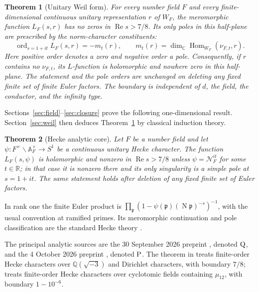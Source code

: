 \documentclass[11pt,a4paper]{article}
\numberwithin{equation}{section}
\newtheorem{theorem}{Theorem}[section]
\theoremstyle{definition}
\theoremstyle{remark}
\newcommand{\RR}{\mathbb R}
\newcommand{\CC}{\mathbb C}
\newcommand{\Rea}{\operatorname{Re}}
\newcommand{\Norm}{\operatorname{N}}
\newcommand{\Qsrc}{\textup{Q}}
\newcommand{\Psrc}{\textup{P}}
\begin{document}
\begin{theorem}[Unitary Weil form]\label{thm:weil-main}
For every number field $F$ and every finite-dimensional continuous
unitary representation $r$ of $W_F$, the meromorphic function
$L_F(s,r)$ has no zeros in $\Rea s>7/8$.  Its only poles in this
half-plane are prescribed by the norm-character constituents:
\begin{equation}\label{eq:weil-main-divisor}
 \operatorname{ord}_{s=1+it}L_F(s,r)
   =-m_t(r),\qquad
 m_t(r)=\dim_{\CC}\operatorname{Hom}_{W_F}(\nu_{F,t},r).
\end{equation}
Here positive order denotes a zero and negative order a pole.
Consequently, if $r$ contains no $\nu_{F,t}$, its $L$-function is
holomorphic and nowhere zero in this half-plane.  The statement and
the pole orders are unchanged on deleting any fixed finite set of
finite Euler factors.  The boundary is independent of $d$, the field,
the conductor, and the infinity type.
\end{theorem}

Sections~\ref{sec:field}--\ref{sec:closure} prove the following
one-dimensional result. Section~\ref{sec:weil} then deduces
Theorem~\ref{thm:weil-main} by classical induction theory.

\begin{theorem}[Hecke analytic core]\label{thm:main}
Let $F$ be a number field and let
$\psi:F^\times\backslash\mathbb A_F^\times\longrightarrow S^1$
be a continuous unitary Hecke character. The function $L_F(s,\psi)$
is holomorphic and nonzero in $\Rea s>7/8$ unless
$\psi=\mathcal N_F^{it}$ for some $t\in\RR$; in that case it is
nonzero there and its only singularity is a simple pole at $s=1+it$.
The same statement holds after deletion of any fixed finite set of
Euler factors.
\end{theorem}

In rank one the finite Euler product is
$\prod_{\mathfrak p}(1-\psi(\mathfrak p)(\Norm\mathfrak p)^{-s})^{-1}$,
with the usual convention at ramified primes.  Its meromorphic
continuation and pole classification are the standard Hecke theory
\cite{Tate}.

The principal analytic sources are the 30 September 2026 preprint
\cite{Q}, denoted $\Qsrc$, and the 4 October 2026 preprint
\cite{P}, denoted $\Psrc$. The theorem in \cite[Theorem~1.1]{Q} treats finite-order Hecke
characters over $\mathbb Q(\sqrt{-3})$ and Dirichlet characters, with
boundary $7/8$; \cite[Theorem~1.2]{P} treats finite-order Hecke characters
over cyclotomic fields containing $\mu_{12}$, with boundary $1-10^{-6}$.
\end{document}
